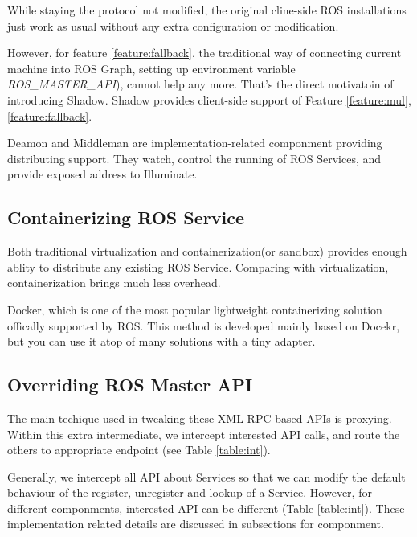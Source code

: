 While staying the protocol not modified, the original cline-side ROS installations just work as
usual without any extra configuration or modification.

However, for feature \ref{feature:fallback}, the traditional way of connecting current machine into ROS Graph,
setting up environment variable \emph{ROS\_MASTER\_API}), cannot help any more.
That's the direct motivatoin of introducing Shadow.
Shadow provides client-side support of Feature \ref{feature:mul}, \ref{feature:fallback}. 

Deamon and Middleman are implementation-related componment providing distributing support.
They watch, control the running of ROS Services, and provide exposed address to Illuminate.

\subsection{Containerizing ROS Service}
Both traditional virtualization and containerization(or sandbox) provides enough ablity to distribute any existing ROS Service.
Comparing with virtualization, containerization brings much less overhead. %

Docker, which is one of the most popular lightweight containerizing solution offically supported by ROS.
This method is developed mainly based on Docekr, but you can use it atop of many solutions with a tiny adapter. 

\subsection{Overriding ROS Master API}
The main techique used in tweaking these XML-RPC based APIs is proxying.
Within this extra intermediate, we intercept interested API calls,
and route the others to appropriate endpoint (see Table \ref{table:int}).

Generally, we intercept all API about Services so that we can modify the default behaviour of the register,
unregister and lookup of a Service.
However, for different componments, interested API can be different (Table \ref{table:int}).
These implementation related details are discussed in subsections for componment.
 
